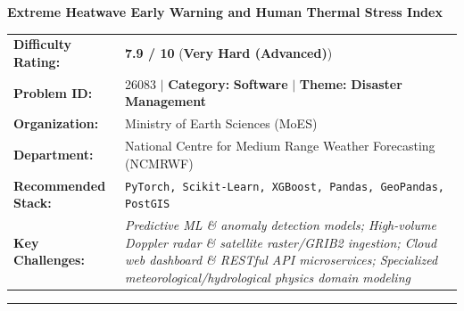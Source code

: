 \documentclass[10pt,a4paper]{article}
\begin{document}
\begin{tcolorbox}[pscard, title={"\textbf{SIH26083} \quad $\vert$ \quad Extreme Heatwave Early Warning and Human Thermal Stress Index}]
\textbf{\large Extreme Heatwave Early Warning and Human Thermal Stress Index}\\[0.25cm]

\begin{tabular}{@{}lp{12.5cm}@{}}
\textbf{Difficulty Rating:} & \textcolor{diffveryhard}{\textbf{\Large 7.9 / 10}} \quad (\textbf{Very Hard (Advanced)}) \\
\textbf{Problem ID:} & 26083 \quad $\vert$ \quad \textbf{Category:} \textbf{Software} \quad $\vert$ \quad \textbf{Theme:} \textbf{Disaster Management} \\
\textbf{Organization:} & Ministry of Earth Sciences (MoES) \\
\textbf{Department:} & National Centre for Medium Range Weather Forecasting (NCMRWF) \\
\textbf{Recommended Stack:} & \texttt{PyTorch, Scikit-Learn, XGBoost, Pandas, GeoPandas, PostGIS} \\
\textbf{Key Challenges:} & \textit{\small Predictive ML \& anomaly detection models; High-volume Doppler radar \& satellite raster/GRIB2 ingestion; Cloud web dashboard \& RESTful API microservices; Specialized meteorological/hydrological physics domain modeling} \\
\end{tabular}

\vspace{0.2cm}
\hrule
\vspace{0.2cm}


\end{tcolorbox}
\end{document}
